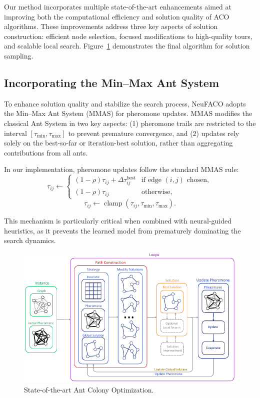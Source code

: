 \documentclass[a4paper,conference]{IEEEtran}
\begin{document}
Our method incorporates multiple state-of-the-art enhancements aimed at improving both the computational efficiency and solution quality of ACO algorithms. These improvements address three key aspects of solution construction: efficient node selection, focused modifications to high-quality tours, and scalable local search. Figure~\ref{fig:FACO} demonstrates the final algorithm for solution sampling.

\subsection{Incorporating the Min--Max Ant System}
To enhance solution quality and stabilize the search process, NeuFACO adopts the Min--Max Ant System (MMAS) \cite{MMAS} for pheromone updates. MMAS modifies the classical Ant System in two key aspects: (1) pheromone trails are restricted to the interval $[\tau_{\min},\tau_{\max}]$ to prevent premature convergence, and (2) updates rely solely on the best-so-far or iteration-best solution, rather than aggregating contributions from all ants.

In our implementation, pheromone updates follow the standard MMAS rule:
\begin{equation}
\tau_{ij} \leftarrow \begin{cases}
(1-\rho)\tau_{ij} + \Delta\tau_{ij}^{\text{best}} & \text{if edge }(i,j) \text{ chosen},\\
(1-\rho)\tau_{ij} & \text{otherwise},
\end{cases}
\end{equation}
\begin{equation}
\tau_{ij} \leftarrow \operatorname{clamp}(\tau_{ij},\tau_{\min},\tau_{\max}).
\end{equation}

This mechanism is particularly critical when combined with neural-guided heuristics, as it prevents the learned model from prematurely dominating the search dynamics.

\begin{figure}[!htb]
  \centering
  \includegraphics[width=\linewidth]{FACO.pdf}
  \caption{State-of-the-art Ant Colony Optimization.}
  \label{fig:FACO}
\end{figure}
\end{document}
